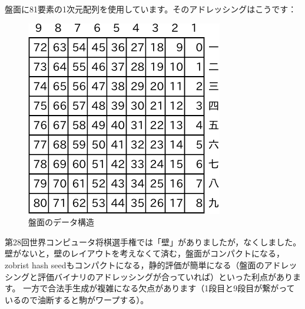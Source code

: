 \documentclass[a4paper]{ltjsarticle}
\begin{document}
盤面に81要素の1次元配列を使用しています。そのアドレッシングはこうです：
\begin{figure}[H]
  \centering
  \includegraphics{fig/fig1.pdf}
  \caption{盤面のデータ構造}
\end{figure}

第28回世界コンピュータ将棋選手権では「壁」がありましたが，なくしました。
壁がないと，壁のレイアウトを考えなくて済む，盤面がコンパクトになる，zobrist hash seedもコンパクトになる，静的評価が簡単になる（盤面のアドレッシングと評価バイナリのアドレッシングが合っていれば）といった利点があります。
一方で合法手生成が複雑になる欠点があります（1段目と9段目が繋がっているので油断すると駒がワープする）。
\end{document}
